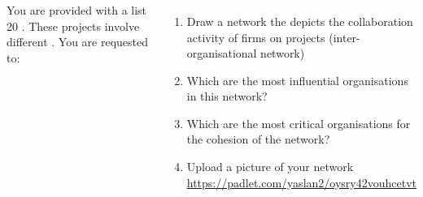 \documentclass[8pt]{beamer}
\begin{document}
\begin{frame}
\frametitle{\insertsection}

\begin{columns}[c]
You are provided with a list 20 {\color{blue}{R\&D projects}}. These projects involve different {\color{blue}{types of organisations}}. You are requested to:

\medskip

\begin{enumerate}
\item Draw a network the depicts the collaboration activity of firms on projects (inter-organisational network)

\medskip

\item Which are the most influential organisations in this network?

\medskip

\item Which are the most critical organisations for the cohesion of the network?

\medskip

\item Upload a picture of your network \\
	\url{https://padlet.com/yaslan2/oysry42vouhcetvt}
	
\end{enumerate}




\end{columns}
\end{frame}
\end{document}
